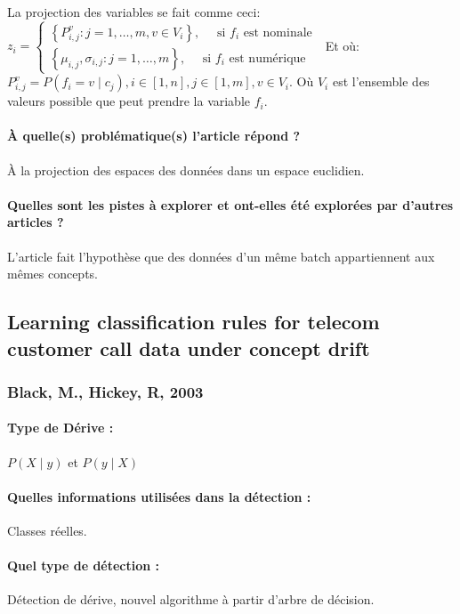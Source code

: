 \documentclass[11pt,a4paper]{report}
\begin{document}
La projection des variables se fait comme ceci: $z_{i}=\left\{\begin{array}{l}
\left\{P_{i, j}^{v}: j=1, \ldots, m, v \in V_{i}\right\}, \quad \text { si } f_{i} \text { est nominale } \\
\left\{\mu_{i, j}, \sigma_{i, j}: j=1, \ldots, m\right\}, \quad \text { si } f_{i} \text { est numérique }
\end{array}\right.$
Et où:
$P_{i, j}^{v}=P\left(f_{i}=v \mid c_{j}\right), i \in[1, n], j \in[1, m], v \in V_{i}$. Où $V_{i}$ est l'ensemble des valeurs possible que peut prendre la variable $f_{i}$.
\paragraph{À quelle(s) problématique(s) l'article répond ?} À la projection des espaces des données dans un espace euclidien.

\paragraph{Quelles sont les pistes à explorer et ont-elles  été explorées par d'autres articles ?} L'article fait l'hypothèse que des données d'un même batch appartiennent aux mêmes concepts.







\subsection{Learning classification rules for telecom  customer call data under concept drift}
\subsubsection{Black, M., Hickey, R, 2003}

\paragraph{Type de Dérive :} $P(X\mid y)$ et $P(y \mid X)$
\paragraph{Quelles informations utilisées dans la détection :} Classes réelles.
\paragraph{Quel type de détection :} Détection de dérive, nouvel algorithme à partir d'arbre de décision.
\end{document}
